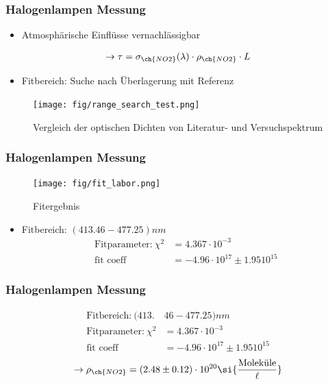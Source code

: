 \documentclass{beamer}
\begin{document}
\begin{frame} 
    \frametitle{Halogenlampen Messung}
	\begin{itemize}
    	\item Atmosphärische Einflüsse vernachlässigbar
	\end{itemize}
	\begin{align}
	 	\to \tau = \sigma_{\ch{NO2}}(\lambda) \cdot \rho_{\ch{NO2}} \cdot L
	\end{align}
    \begin{itemize}
    	\item Fitbereich: Suche nach Überlagerung mit  Referenz
	\end{itemize}
	\begin{figure}[h]
		\texttt{[image: fig/range\_search\_test.png]}
		\caption{Vergleich der optischen Dichten von Literatur- und Versuchspektrum}
	\end{figure}
\end{frame} 

\begin{frame}
	\frametitle{Halogenlampen Messung}
     \begin{figure}[h]
    	\texttt{[image: fig/fit\_labor.png]}
    	\caption{Fitergebnis}
    \end{figure}
    \begin{itemize} 
    	\item Fitbereich: $(413.46 - 477.25) \si{nm}$
    		\begin{align}
    		   \text{Fitparameter:}\ \chi^2 &= 4.367 \cdot 10^{-3}\\
    		   \text{fit coeff} &= -4.96 \cdot 10^{17} \pm 1.95 10^{15}
    		\end{align}
    \end{itemize}
\end{frame} 

\begin{frame}
	\frametitle{Halogenlampen Messung}
	\begin{align}
		\text{Fitbereich:}\ (413.&46 - 477.25) \si{nm}\\
		\text{Fitparameter:}\ \chi^2 &= 4.367 \cdot 10^{-3}\\
		\text{fit coeff} &= -4.96 \cdot 10^{17} \pm 1.95 10^{15}
	\end{align}
	\begin{align}    
		\to \rho_{\ch{NO2}} = (2.48 \pm 0.12) \cdot 10^{20} \si{\frac{\text{Moleküle}}{\ell}}
	\end{align}
\end{frame}
\end{document}
